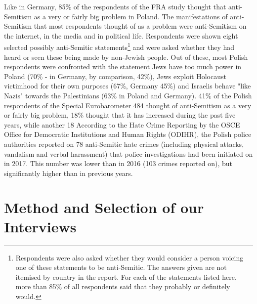 \begin{itemize}
    Like in Germany, 85\% of the respondents of the FRA study thought that anti-Semitism as a very or fairly big problem in Poland. The manifestations of anti-Semitism that most respondents thought of as a problem were anti-Semitism on the internet, in the media and in political life. Respondents were shown eight selected possibly anti-Semitic statements\footnote{Respondents were also asked whether they would consider a person voicing one of these statements to be anti-Semitic. The answers given are not itemised by country in the report. For each of the statements listed here, more than 85\% of all respondents said that they probably or definitely would.} and were asked whether they had heard or seen these being made by non-Jewish people. Out of these, most Polish respondents were confronted with the statement Jews have too much power in Poland (70\% - in Germany, by comparison, 42\%), Jews exploit Holocaust victimhood for their own purposes (67\%, Germany 45\%) and Israelis behave "like Nazis" towards the Palestinians (63\% in Poland and Germany). 41\% of the Polish respondents of the Special Eurobarometer 484 thought of anti-Semitism as a very or fairly big problem, 18\% thought that it has increased during the past five years, while another 18%
    According to the Hate Crime Reporting by the OSCE Office for Democratic Institutions and Human Rights (ODIHR), the Polish police authorities reported on 78 anti-Semitic hate crimes (including physical attacks, vandalism and verbal harassment) that police investigations had been initiated on in 2017. This number was lower than in 2016 (103 crimes reported on), but significantly higher than in previous years. 
\end{itemize}

 

\section*{Method and Selection of our Interviews}

